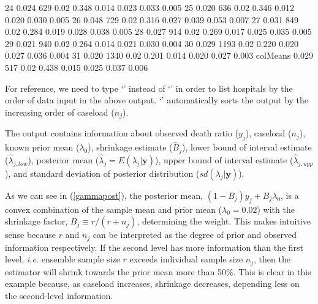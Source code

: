 \documentclass[article]{jss}
\begin{document}
\begin{CodeChunk}
\begin{CodeOutput}
24          0.024  629       0.02     0.348    0.014     0.023    0.033   0.005
25          0.020  636       0.02     0.346    0.012     0.020    0.030   0.005
26          0.048  729       0.02     0.316    0.027     0.039    0.053   0.007
27          0.031  849       0.02     0.284    0.019     0.028    0.038   0.005
28          0.027  914       0.02     0.269    0.017     0.025    0.035   0.005
29          0.021  940       0.02     0.264    0.014     0.021    0.030   0.004
30          0.029 1193       0.02     0.220    0.020     0.027    0.036   0.004
31          0.020 1340       0.02     0.201    0.014     0.020    0.027   0.003
colMeans    0.029  517       0.02     0.438    0.015     0.025    0.037   0.006
\end{CodeOutput}
\end{CodeChunk}
For reference, we need to type `' instead of `' in order to list hospitals by the order of data input in the above output. `' automatically sorts the output by the increasing order of caseload ($n_{j}$). 


The output contains information about observed death ratio ($y_{j}$), caseload ($n_{j}$), known prior mean ($\lambda_{0}$), shrinkage estimate ($\hat{B}_{j}$), lower bound of interval estimate ($\hat{\lambda}_{j, low}$), posterior mean ($\hat{\lambda}_{j}=E(\lambda_{j}\vert \textbf{y})$), upper bound of interval estimate ($\hat{\lambda}_{j, upp}$), and standard deviation of posterior distribution ($sd(\lambda_{j}\vert \textbf{y})$).


As we can see in (\ref{gammapost}), the posterior mean, $(1-B_{j})y_{j} + B_{j}\lambda_{0}$, is a convex combination of the sample mean and prior mean ($\lambda_{0}=0.02$) with the shrinkage factor, $B_{j}\equiv r / (r + n_{j})$, determining the weight. This makes intuitive sense because $r$ and $n_{j}$ can be interpreted as the degree of prior and observed information respectively. If the second level has more information than the first level, \emph{i.e.} ensemble sample size $r$ exceeds individual sample size $n_{j}$, then the estimator will shrink towards the prior mean more than 50\%. This is clear in this example because, as caseload increases, shrinkage decreases, depending less on the second-level information.
\end{document}
